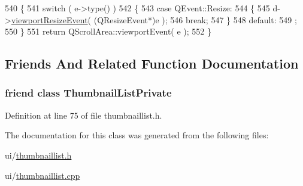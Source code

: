 \begin{DoxyCode}
540 \{
541     \textcolor{keywordflow}{switch} ( e->type() )
542     \{
543         \textcolor{keywordflow}{case} QEvent::Resize:
544         \{
545             d->\hyperlink{classThumbnailListPrivate_a50ec7d81dbde95a64c239c8b39aed7e9}{viewportResizeEvent}( (QResizeEvent*)e );
546             \textcolor{keywordflow}{break};
547         \}
548         \textcolor{keywordflow}{default}:
549             ;
550     \}
551     \textcolor{keywordflow}{return} QScrollArea::viewportEvent( e );
552 \}
\end{DoxyCode}


\subsection{Friends And Related Function Documentation}
\hypertarget{classThumbnailList_a4618ad8163c3f52e81c6aa6ef186f369}{
\subsubsection[{Thumbnail\+List\+Private}]{\setlength{\rightskip}{0pt plus 5cm}friend class {\bf Thumbnail\+List\+Private}\hspace{0.3cm}{\ttfamily [friend]}}}\label{classThumbnailList_a4618ad8163c3f52e81c6aa6ef186f369}


Definition at line 75 of file thumbnaillist.\+h.



The documentation for this class was generated from the following files\+:\begin{DoxyCompactItemize}
\item 
ui/\hyperlink{thumbnaillist_8h}{thumbnaillist.\+h}\item 
ui/\hyperlink{thumbnaillist_8cpp}{thumbnaillist.\+cpp}\end{DoxyCompactItemize}
